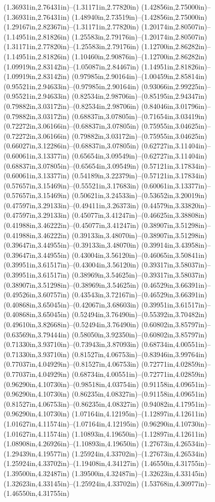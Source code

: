 (1.36931in,2.76431in)--(1.31171in,2.77820in) (1.42856in,2.75000in)--(1.36931in,2.76431in) (1.48940in,2.73519in)--(1.42856in,2.75000in) (1.29167in,2.82367in)--(1.31171in,2.77820in) (1.20174in,2.80507in)--(1.14951in,2.81826in) (1.25583in,2.79176in)--(1.20174in,2.80507in) (1.31171in,2.77820in)--(1.25583in,2.79176in) (1.12700in,2.86282in)--(1.14951in,2.81826in) (1.10460in,2.90876in)--(1.12700in,2.86282in) (1.09919in,2.83142in)--(1.05087in,2.84467in) (1.14951in,2.81826in)--(1.09919in,2.83142in) (0.97985in,2.90164in)--(1.00459in,2.85814in) (0.95521in,2.94633in)--(0.97985in,2.90164in) (0.93066in,2.99225in)--(0.95521in,2.94633in) (0.82534in,2.98706in)--(0.85195in,2.94347in) (0.79882in,3.03172in)--(0.82534in,2.98706in) (0.84046in,3.01796in)--(0.79882in,3.03172in) (0.68837in,3.07805in)--(0.71654in,3.03419in) (0.72272in,3.06166in)--(0.68837in,3.07805in) (0.75955in,3.04625in)--(0.72272in,3.06166in) (0.79882in,3.03172in)--(0.75955in,3.04625in) (0.66027in,3.12286in)--(0.68837in,3.07805in) (0.62727in,3.11404in)--(0.60061in,3.13377in) (0.65654in,3.09549in)--(0.62727in,3.11404in) (0.68837in,3.07805in)--(0.65654in,3.09549in) (0.57121in,3.17834in)--(0.60061in,3.13377in) (0.54189in,3.22379in)--(0.57121in,3.17834in) (0.57657in,3.15469in)--(0.55521in,3.17683in) (0.60061in,3.13377in)--(0.57657in,3.15469in) (0.50621in,3.24533in)--(0.53652in,3.20019in) (0.47597in,3.29133in)--(0.49411in,3.26373in) (0.44579in,3.33820in)--(0.47597in,3.29133in) (0.45077in,3.41247in)--(0.46625in,3.38808in) (0.41988in,3.46222in)--(0.45077in,3.41247in) (0.38907in,3.51298in)--(0.41988in,3.46222in) (0.39133in,3.48070in)--(0.38907in,3.51298in) (0.39647in,3.44955in)--(0.39133in,3.48070in) (0.39914in,3.43958in)--(0.39647in,3.44955in) (0.43004in,3.56120in)--(0.46065in,3.50841in) (0.39951in,3.61517in)--(0.43004in,3.56120in) (0.39317in,3.58037in)--(0.39951in,3.61517in) (0.38969in,3.54625in)--(0.39317in,3.58037in) (0.38907in,3.51298in)--(0.38969in,3.54625in) (0.46529in,3.66391in)--(0.49526in,3.60757in) (0.43543in,3.72167in)--(0.46529in,3.66391in) (0.40868in,3.65045in)--(0.42067in,3.68603in) (0.39951in,3.61517in)--(0.40868in,3.65045in) (0.52494in,3.76490in)--(0.55392in,3.70482in) (0.49610in,3.82668in)--(0.52494in,3.76490in) (0.60802in,3.85797in)--(0.63569in,3.79444in) (0.58050in,3.92350in)--(0.60802in,3.85797in) (0.71330in,3.93710in)--(0.73943in,3.87093in) (0.68734in,4.00551in)--(0.71330in,3.93710in) (0.81527in,4.06753in)--(0.83946in,3.99764in) (0.77037in,4.04929in)--(0.81527in,4.06753in) (0.72771in,4.02859in)--(0.77037in,4.04929in) (0.68734in,4.00551in)--(0.72771in,4.02859in) (0.96290in,4.10730in)--(0.98518in,4.03754in) (0.91158in,4.09651in)--(0.96290in,4.10730in) (0.86235in,4.08327in)--(0.91158in,4.09651in) (0.81527in,4.06753in)--(0.86235in,4.08327in) (0.94082in,4.17951in)--(0.96290in,4.10730in) (1.07164in,4.12195in)--(1.12897in,4.12611in) (1.01627in,4.11574in)--(1.07164in,4.12195in) (0.96290in,4.10730in)--(1.01627in,4.11574in) (1.10893in,4.19650in)--(1.12897in,4.12611in) (1.08908in,4.26926in)--(1.10893in,4.19650in) (1.27673in,4.26534in)--(1.29439in,4.19577in) (1.25924in,4.33702in)--(1.27673in,4.26534in) (1.25924in,4.33702in)--(1.19408in,4.34127in) (1.46550in,4.31755in)--(1.39500in,4.32487in) (1.39500in,4.32487in)--(1.32623in,4.33145in) (1.32623in,4.33145in)--(1.25924in,4.33702in) (1.53768in,4.30977in)--(1.46550in,4.31755in) 